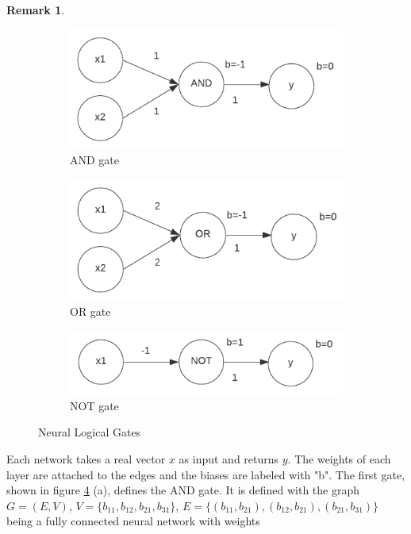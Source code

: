 \documentclass{article}
\theoremstyle{definition}
\newtheorem{remark}[theorem]{Remark}
\begin{document}
\begin{remark}
\begin{figure}[H]
    \centering
    \begin{subfigure}[b]{0.3\textwidth}
    	\centering
        \includegraphics[width=\textwidth]{graphics/AND_gate.pdf}
        \caption{AND gate}
        \label{fig:AND}
    \end{subfigure}
    \begin{subfigure}[b]{0.3\textwidth}
    	\centering
        \includegraphics[width=\textwidth]{graphics/OR_gate.pdf}
        \caption{OR gate}
        \label{fig:OR}
    \end{subfigure}
    \begin{subfigure}[b]{0.3\textwidth}
    	\centering
        \includegraphics[width=\textwidth]{graphics/NOT_gate.pdf}
        \caption{NOT gate}
        \label{fig:NOT}
    \end{subfigure}
    \caption{Neural Logical Gates}\label{fig:neural_logic_gates}
\end{figure}
Each network takes a real vector $x$ as input and returns $y$. The weights of each layer are attached to the edges and the biases are labeled with "b". The first gate, shown in figure \ref{fig:neural_logic_gates} (a), defines the AND gate. It is defined with the graph $G=(E, V)$, $V=\{ b_{11}, b_{12}, b_{21}, b_{31} \}$, $E=\{ (b_{11}, b_{21}), (b_{12}, b_{21}), (b_{21}, b_{31})\}$ being a fully connected neural network with weights 

\end{remark}
\end{document}
